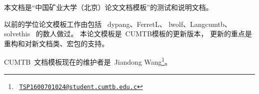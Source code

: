 
本文档是“中国矿业大学（北京）论文文档模板”的测试和说明文档。

以前的学位论文模板工作由包括~%
dypang\supercite{dypang}、FerretL\supercite{FerretL}、
lwolf\supercite{lwolf}、Langcumtb\supercite{Langcumtb}、
solvethis\supercite{solvethis}~%
的数人做过。
本论文模板是~CUMTB模板的更新版本，
更新的重点是重构和对新文档类、宏包的支持。

CUMTB~文档模板现在的维护者是~Jiandong Wang\footnote%
{\ \href{TSP1600701024@student.cumtb.edu.cn}{\texttt{TSP1600701024@student.cumtb.edu.c}}}。

